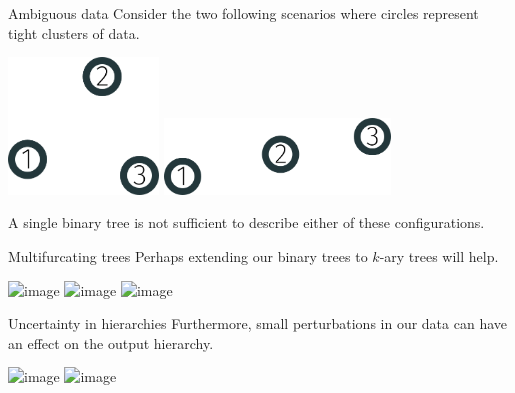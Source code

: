 \documentclass[10pt, compress]{beamer}
\begin{document}
\begin{frame}{Ambiguous data}
  Consider the two following scenarios where
  circles represent tight clusters of data.

  \begin{center}
  \includegraphics[width=0.3\textwidth]{img/3-cluster}\hfill
  \includegraphics[width=0.45\textwidth]{img/3-cluster-line}
  \end{center}

  \pause

  A single binary tree is not sufficient to describe either
  of these configurations.


\end{frame}

\begin{frame}{Multifurcating trees}
  Perhaps extending our binary trees to $k$-ary trees will help.

  \begin{center}
    \includegraphics<1>[width=0.8\textwidth]{img/3-cluster-both.png}
    \includegraphics<2>[width=0.8\textwidth]{img/3-cluster-both-2.png}
    \includegraphics<3>[width=0.8\textwidth]{img/3-cluster-both-3.png}
  \end{center}

\end{frame}

\begin{frame}{Uncertainty in hierarchies}
  Furthermore, small perturbations in our data
  can have an effect on the output
  hierarchy.

  \begin{center}
    \includegraphics<1>[width=0.8\textwidth]{img/3-cluster-line-noperturb}
    \includegraphics<2->[width=0.8\textwidth]{img/3-cluster-line-perturb}
  \end{center}

\end{frame}
\end{document}

